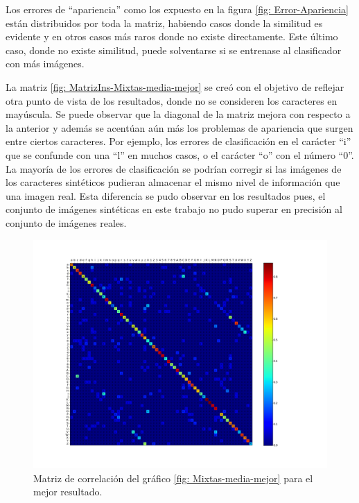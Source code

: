 	Los errores de ``apariencia'' como los expuesto en la figura \ref{fig: Error-Apariencia} están distribuidos por toda la matriz, habiendo casos donde la similitud es evidente y en otros casos más raros donde no existe directamente. Este último caso, donde no existe similitud, puede solventarse si se entrenase al clasificador con más imágenes.

	La matriz \ref{fig: MatrizIns-Mixtas-media-mejor} se creó con el objetivo de reflejar otra punto de vista de los resultados, donde no se consideren los caracteres en mayúscula. Se puede observar que la diagonal de la matriz mejora con respecto a la anterior y además se acentúan aún más los problemas de apariencia que surgen entre ciertos caracteres. Por ejemplo, los errores de clasificación en el carácter ``i'' que se confunde con una ``l'' en muchos casos, o el carácter ``o'' con el número ``0''. La mayoría de los errores de clasificación se podrían corregir si las imágenes de los caracteres sintéticos pudieran almacenar el mismo nivel de información que una imagen real. Esta diferencia se pudo observar en los resultados pues, el conjunto de imágenes sintéticas en este trabajo no pudo superar en precisión al conjunto de imágenes reales.

			\begin{figure}[!htbp]
				\centerline{\includegraphics[scale=0.4]{img/resultados/mixtas/best_mean_matrix_Alpha0,01_2040-4.png}}
				\caption[Mixtas Matriz expon]{Matriz de correlación del gráfico \ref{fig: Mixtas-media-mejor} para el mejor resultado.}
				\label{fig: Mixtas-Matrix-media-mejor}
			\end{figure}

